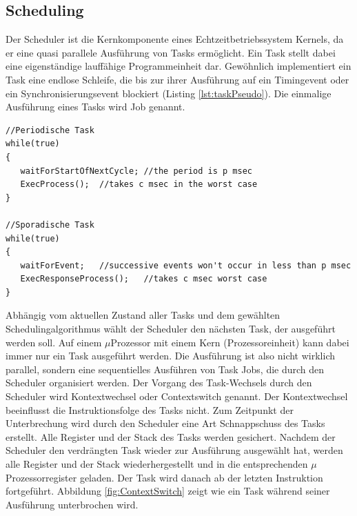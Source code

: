 \subsection{Scheduling}
\label{Scheduling}
Der Scheduler ist die Kernkomponente eines Echtzeitbetriebssystem Kernels, da er eine quasi parallele Aus\-füh\-rung von Tasks ermöglicht. Ein Task stellt dabei eine ei\-gen\-stän\-di\-ge lauffähige Programmeinheit dar. Gewöhnlich implementiert ein Task eine endlose Schleife, die bis zur ihrer Ausführung auf ein Timingevent oder ein Synchronisierungsevent blockiert (Listing \ref{lst:taskPseudo}). Die einmalige Aus\-füh\-rung eines Tasks wird Job\cite{9780128015070} genannt. 
\begin{lstlisting}[caption={Pseudocode für die Implementierungsmuster eines periodischen (zeitgesteuert) Tasks und sporadischen (eventgesteuert) Tasks ~\protect\citeA{LorenK.Rhodes2017}}, linewidth=8cm,captionpos=b, label=lst:taskPseudo, float=hbt]
//Periodische Task
while(true)
{
   waitForStartOfNextCycle; //the period is p msec
   ExecProcess();  //takes c msec in the worst case
}

//Sporadische Task
while(true)
{
   waitForEvent;   //successive events won't occur in less than p msec
   ExecResponseProcess();   //takes c msec worst case
}
\end{lstlisting}
Abhängig vom aktuellen Zustand aller Tasks und dem gewählten Scheduling\-algorithmus wählt der Scheduler den nächsten Task, der ausgeführt werden soll. Auf einem $\mu$\-Pro\-zesso\-r mit einem Kern (Prozessoreinheit) kann dabei immer nur ein Task  ausgeführt werden. Die Ausführung ist also nicht wirklich parallel, sondern eine sequentielles Ausführen von Task Jobs, die durch den Scheduler organisiert werden. Der Vorgang des Task-Wechsels durch den Scheduler wird Kontextwechsel oder Contextswitch genannt. Der Kontextwechsel beeinflusst die Instruktionsfolge des Tasks nicht. Zum Zeitpunkt der Unterbrechung wird durch den Scheduler eine Art Schnappschuss des Tasks erstellt. Alle Register und der Stack des Tasks werden gesichert. Nachdem der Scheduler den verdrängten Task wieder zur Aus\-füh\-rung ausgewählt hat, werden alle Register und der Stack wiederhergestellt und in die entsprechenden $\mu$\-Pro\-zes\-sor\-re\-gis\-ter geladen. Der Task wird danach ab der letzten Instruktion fortgeführt. Abbildung \ref{fig:ContextSwitch} zeigt wie ein Task wäh\-rend seiner Ausführung unterbrochen wird.

